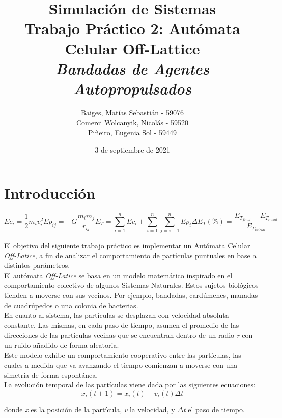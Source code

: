 \documentclass[12pt, a4paper]{report}
\title{%
\textbf{Simulación de Sistemas}\\
Trabajo Práctico 2: Autómata Celular Off-Lattice \\
\large \emph{Bandadas de Agentes Autopropulsados}
}
\author{Baiges, Matías Sebastián - 59076\\
Comerci Wolcanyik, Nicolás - 59520\\
Piñeiro, Eugenia Sol - 59449
}
\date{3 de septiembre de 2021}
\begin{document}
\maketitle

\tableofcontents
\newpage

\section{Introducción}

\begin{equation}
    \label{eq:velocity}
    Ec_i = \frac{1}{2} m_i v_i^2   Ep_{ij} = -G \frac{m_i m_j}{r_{ij}} E_T = \sum_{i = 1}^{n}  Ec_i + \sum_{i = 1}^{n} \sum_{j = i+1}^{n} Ep_i  \Delta E_T(\%) = \frac{ E_{T_{final}} - E_{T_{incial}} } { E_{T_{inicial}} }
\end{equation}

El objetivo del siguiente trabajo práctico es implementar un Autómata Celular \emph{Off-Latice}, 
a fin de analizar el comportamiento de partículas puntuales en base a distintos parámetros.\\

El autómata \emph{Off-Latice} se basa en un modelo matemático inspirado en el comportamiento colectivo de algunos Sistemas Naturales. Estos sujetos biológicos tienden a moverse con sus vecinos. Por ejemplo, bandadas, cardúmenes, manadas de cuadrúpedos o una colonia de bacterias.\cite{vicsek1995novel}\\

En cuanto al sistema, las partículas se desplazan con velocidad absoluta constante. Las mismas, en cada paso de tiempo, asumen el promedio de las direcciones de las partículas vecinas que se encuentran dentro de un radio \emph{r} con un ruido añadido de forma aleatoria.\\

Este modelo exhibe un comportamiento cooperativo entre las partículas, las cuales a medida que va avanzando el tiempo comienzan a moverse con una simetría de forma espontánea.\\ 

La evolución temporal de las partículas viene dada por las siguientes ecuaciones: 
\begin{equation}
\label{eq:velocity}
x_i(t+1) = x_i(t) + v_i(t) \Delta t 
\end{equation}

donde \emph{x} es la posición de la partícula, \emph{v} la velocidad, y $\Delta$\emph{t} el paso de tiempo.  
\end{document}
